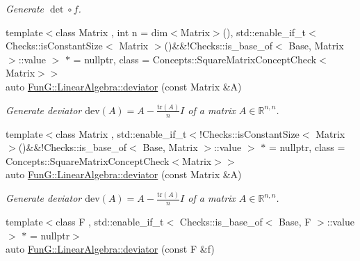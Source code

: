 \begin{DoxyCompactItemize}
\begin{DoxyCompactList}\small\item\em Generate $\det\circ f$. \end{DoxyCompactList}\item 
\hypertarget{group__LinearAlgebraGroup_ga7c0b1db93cfc5779a3b1e7eb1646c213}{{\footnotesize template$<$class Matrix , int n = dim$<$\-Matrix$>$(), std\-::enable\-\_\-if\-\_\-t$<$ Checks\-::is\-Constant\-Size$<$ Matrix $>$()\&\&!\-Checks\-::is\-\_\-base\-\_\-of$<$ Base, Matrix $>$\-::value $>$ $\ast$  = nullptr, class  = Concepts\-::\-Square\-Matrix\-Concept\-Check$<$\-Matrix$>$$>$ }\\auto \hyperlink{group__LinearAlgebraGroup_ga7c0b1db93cfc5779a3b1e7eb1646c213}{Fun\-G\-::\-Linear\-Algebra\-::deviator} (const Matrix \&A)}\label{group__LinearAlgebraGroup_ga7c0b1db93cfc5779a3b1e7eb1646c213}

\begin{DoxyCompactList}\small\item\em Generate deviator $ \mathrm{dev}(A) = A - \frac{\mathrm{tr}(A)}{n}I $ of a matrix $ A\in\mathbb{R}^{n,n} $. \end{DoxyCompactList}\item 
\hypertarget{group__LinearAlgebraGroup_gabc90de0d1754cd2e2d190ea8ba62245f}{{\footnotesize template$<$class Matrix , std\-::enable\-\_\-if\-\_\-t$<$!\-Checks\-::is\-Constant\-Size$<$ Matrix $>$()\&\&!\-Checks\-::is\-\_\-base\-\_\-of$<$ Base, Matrix $>$\-::value $>$ $\ast$  = nullptr, class  = Concepts\-::\-Square\-Matrix\-Concept\-Check$<$\-Matrix$>$$>$ }\\auto \hyperlink{group__LinearAlgebraGroup_gabc90de0d1754cd2e2d190ea8ba62245f}{Fun\-G\-::\-Linear\-Algebra\-::deviator} (const Matrix \&A)}\label{group__LinearAlgebraGroup_gabc90de0d1754cd2e2d190ea8ba62245f}

\begin{DoxyCompactList}\small\item\em Generate deviator $ \mathrm{dev}(A) = A - \frac{\mathrm{tr}(A)}{n}I $ of a matrix $ A\in\mathbb{R}^{n,n} $. \end{DoxyCompactList}\item 
\hypertarget{group__LinearAlgebraGroup_gad363f3add577abc046fc525ce83e22d3}{{\footnotesize template$<$class F , std\-::enable\-\_\-if\-\_\-t$<$ Checks\-::is\-\_\-base\-\_\-of$<$ Base, F $>$\-::value $>$ $\ast$  = nullptr$>$ }\\auto \hyperlink{group__LinearAlgebraGroup_gad363f3add577abc046fc525ce83e22d3}{Fun\-G\-::\-Linear\-Algebra\-::deviator} (const F \&f)}\label{group__LinearAlgebraGroup_gad363f3add577abc046fc525ce83e22d3}


\end{DoxyCompactItemize}
